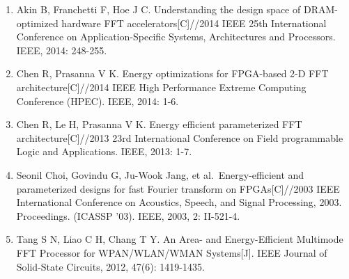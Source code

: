 \documentclass[
  preprint]{elsarticle}
\begin{document}
\begin{enumerate}
  for Large Problem Sizes{[}C{]}//2012 IEEE 20th International Symposium
  on Field-Programmable Custom Computing Machines. IEEE, 2012.
\item
  Akin B, Franchetti F, Hoe J C. Understanding the design space of
  DRAM-optimized hardware FFT accelerators{[}C{]}//2014 IEEE 25th
  International Conference on Application-Specific Systems,
  Architectures and Processors. IEEE, 2014: 248-255.
\item
  Chen R, Prasanna V K. Energy optimizations for FPGA-based 2-D FFT
  architecture{[}C{]}//2014 IEEE High Performance Extreme Computing
  Conference (HPEC). IEEE, 2014: 1-6.
\item
  Chen R, Le H, Prasanna V K. Energy efficient parameterized FFT
  architecture{[}C{]}//2013 23rd International Conference on Field
  programmable Logic and Applications. IEEE, 2013: 1-7.
\item
  Seonil Choi, Govindu G, Ju-Wook Jang, et al.~Energy-efficient and
  parameterized designs for fast Fourier transform on FPGAs{[}C{]}//2003
  IEEE International Conference on Acoustics, Speech, and Signal
  Processing, 2003. Proceedings. (ICASSP '03). IEEE, 2003, 2: II-521-4.
\item
  Tang S N, Liao C H, Chang T Y. An Area- and Energy-Efficient Multimode
  FFT Processor for WPAN/WLAN/WMAN Systems{[}J{]}. IEEE Journal of
  Solid-State Circuits, 2012, 47(6): 1419-1435.
\end{enumerate}
\end{document}
